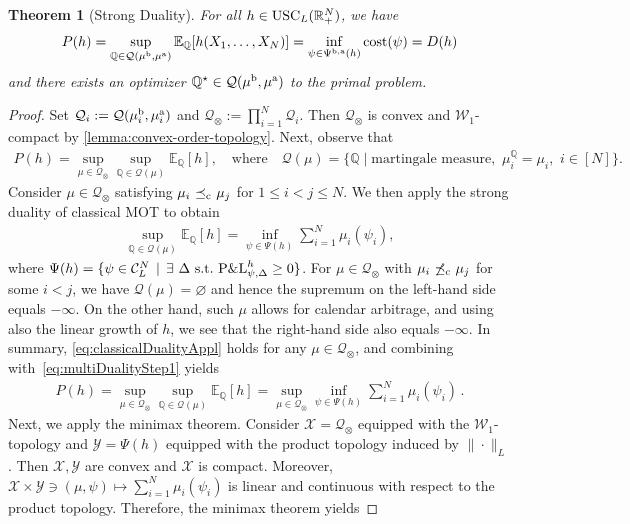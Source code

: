 \documentclass[11pt]{article}
\newcommand{\cC}{\mathcal{C}}
\newcommand{\cQ}{\mathcal{Q}}
\newcommand{\cW}{\mathcal{W}}
\newcommand{\cX}{\mathcal{X}}
\newcommand{\cY}{\mathcal{Y}}
\newcommand{\R}{\mathbb{R}} %
\newcommand{\Q}{\mathbb{Q}} %
\theoremstyle{plain}
\newtheorem{theorem}{Theorem}[section]
\theoremstyle{definition}
\theoremstyle{remark}
\newcommand{\E}{\mathbb{E}}
\DeclareMathOperator{\cleq}{\,\preceq_{\rm c}\,}
\DeclareMathOperator{\ncleq}{\,\not\preceq_{\rm c}\,}
\theoremstyle{plain}
\begin{document}
%
\begin{theorem}[Strong Duality]\label{thm:strong-duality} 
For all $h\in \textnormal{USC}_L(\R^N_+)$, we have   
$$P(h) = \sup_{\Q \in \cQ(\mu^{\rm b}, \mu^{\rm a})} \E_\Q[h(X_1, \ldots, X_N)] = 
\inf_{\psi \in \Psi^{\rm{b,a}}(h)} \textnormal{cost}(\psi) =  D(h)
$$
and there exists an optimizer $\Q^{\star} \in  \cQ(\mu^{\rm b}, \mu^{\rm a})$ to the primal problem. %
\end{theorem}
%
%
%
%
%
%
\begin{proof}%
Set $\cQ_i:= \cQ(\mu_i^{\rm b}, \mu_i^{\rm a})$ and $\cQ_{\otimes}:= \prod_{i=1}^N\cQ_i$. %
Then $\cQ_{\otimes}$ is convex and $\cW_1$-compact by \cref{lemma:convex-order-topology}. 
Next, observe that 
    \begin{align}\label{eq:multiDualityStep1}
    P(h) = \sup_{\mu \in \cQ_{\otimes}} \sup_{\Q \in\cQ(\mu)} \E_\Q[h], \quad\text{where}\quad     \cQ(\mu) = \big\{\Q \mid \text{martingale measure}, \,\, \mu_i^{\Q}= \mu_i,\,\, i \in [N]\big\}.
    \end{align}
    Consider $\mu \in \cQ_{\otimes}$ satisfying $\mu_i\cleq \mu_j$ for $1\leq i<j\leq N$. 
    We then apply the strong duality of classical MOT \cite[Corollary~1.2]{beiglbock2013model} to obtain 
    \begin{align}\label{eq:classicalDualityAppl}
       \sup_{\Q \in\cQ(\mu)} \E_\Q[h] =\inf_{\psi \in \Psi(h)} \sum_{i=1}^N \mu_i(\psi_i),
    \end{align}
where  $\Psi(h) = \{ \psi \in \cC_L^N  \, \mid \, \exists \ {\Delta} \text{ s.t.\ }   \textnormal{P\&L}_{\psi,\Delta}^h\ge 0  \}$. 
For $\mu \in \cQ_{\otimes}$ with $\mu_i\ncleq \mu_j$ for some $i<j$, we have $\cQ(\mu) = \varnothing$ and hence the supremum on the left-hand side equals $-\infty$. On the other hand, such $\mu$ allows for calendar arbitrage, and using also the linear growth of $h$, we see that the right-hand side also equals $-\infty$. In summary, \eqref{eq:classicalDualityAppl} holds for any  $\mu \in \cQ_{\otimes}$, and combining with~\eqref{eq:multiDualityStep1} yields
\begin{align*}
    P(h) = \sup_{\mu \in \cQ_{\otimes}} \sup_{\Q \in\cQ(\mu)} \E_\Q[h] = \sup_{\mu \in \cQ_{\otimes}}\inf_{\psi \in \Psi(h)} \sum_{i=1}^N \mu_i(\psi_i)\,.
\end{align*}
Next, we apply the minimax theorem. Consider $\cX= \cQ_{\otimes}$ equipped with the $\cW_1$-topology and $\cY = \Psi(h)$ equipped with the product topology induced by $\|\cdot\|_{L}$. Then $\cX, \cY$ are convex and  $\cX$ is compact. Moreover, $\cX\times \cY \ni (\mu, \psi)\mapsto \sum_{i=1}^N \mu_i(\psi_i)$ is linear and continuous with respect to the product topology. Therefore, the minimax theorem \cite[Corollary~3.3]{Sion.58} yields   

\end{proof}
\end{document}
